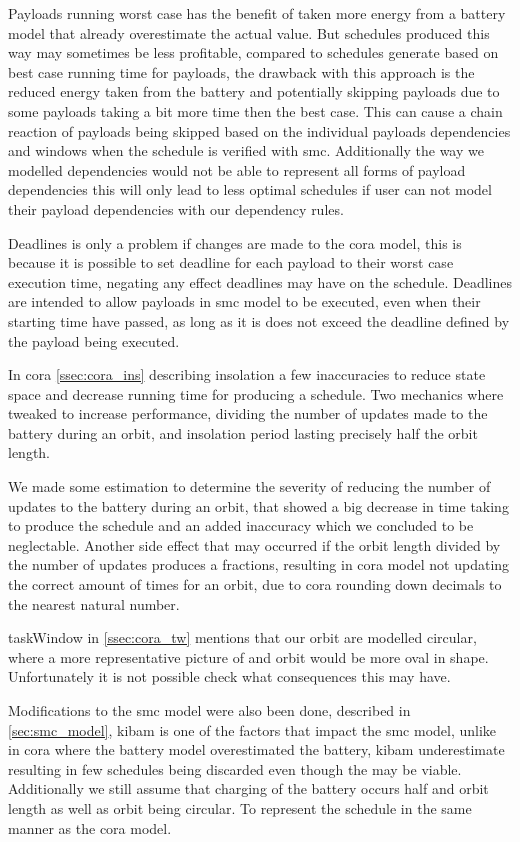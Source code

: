 Payloads running worst case has the benefit of taken more energy from a battery model that already overestimate the actual value. But schedules produced this way may sometimes be less profitable, compared to schedules generate based on best case running time for payloads, the drawback with this approach is the reduced energy taken from the battery and potentially skipping payloads due to some payloads taking a bit more time then the best case. This can cause a chain reaction of payloads being skipped based on the individual payloads dependencies and windows when the schedule is verified with \gls{smc}. Additionally the way we modelled dependencies would not be able to represent all forms of payload dependencies this will only lead to less optimal schedules if user can not model their payload dependencies with our dependency rules.

Deadlines is only a problem if changes are made to the \gls{cora} model, this is because it is possible to set deadline for each payload to their worst case execution time, negating any effect deadlines may have on the schedule. Deadlines are intended to allow payloads in \gls{smc} model to be executed, even when their starting time have passed, as long as it is does not exceed the deadline defined by the payload being executed.

In \gls{cora} \cref{ssec:cora_ins} describing insolation a few inaccuracies to reduce state space and decrease running time for producing a schedule. Two mechanics where tweaked to increase performance, dividing the number of updates made to the battery during an orbit, and insolation period lasting precisely half the orbit length.

We made some estimation to determine the severity of reducing the number of updates to the battery during an orbit, that showed a big decrease in time taking to produce the schedule and an added inaccuracy which we concluded to be neglectable. Another side effect that may occurred  if the orbit length divided by the number of updates produces a fractions, resulting in \gls{cora} model not updating the correct amount of times for an orbit, due to \gls{cora}  rounding down decimals to the nearest natural number.

taskWindow in \cref{ssec:cora_tw} mentions that our orbit are modelled circular, where a more representative picture of and orbit would be more oval in shape. Unfortunately it is not possible check what consequences this may have.

Modifications to the \gls{smc} model were also been done, described in \cref{sec:smc_model}, \gls{kibam} is one of the factors that impact the \gls{smc} model, unlike in \gls{cora} where the battery model overestimated the battery, \gls{kibam} underestimate resulting in few schedules being discarded even though the may be viable. Additionally we still assume that charging of the battery occurs half and orbit length as well as orbit being circular. To represent the schedule in the same manner as the \gls{cora} model.

